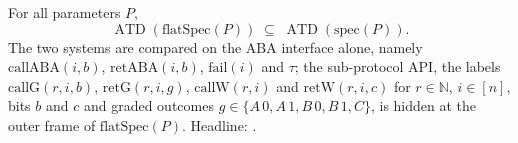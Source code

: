 \begin{theorem}
  \label{thm:aba-flatspec-spec}
  \leanok
  For all parameters $P$,
  \[
    \operatorname{ATD}(\mathrm{flatSpec}(P)) \;\subseteq\;
    \operatorname{ATD}(\mathrm{spec}(P)).
  \]
  The two systems are compared on the ABA interface alone, namely $\mathrm{callABA}(i,b)$, $\mathrm{retABA}(i,b)$, $\mathrm{fail}(i)$ and $\tau$; the sub-protocol API, the labels $\mathrm{callG}(r,i,b)$, $\mathrm{retG}(r,i,g)$, $\mathrm{callW}(r,i)$ and $\mathrm{retW}(r,i,c)$ for $r \in \mathbb{N}$, $i \in [n]$, bits $b$ and $c$ and graded outcomes $g \in \{A\,0, A\,1, B\,0, B\,1, C\}$, is hidden at the outer frame of $\mathrm{flatSpec}(P)$.
  Headline: .
\end{theorem}


